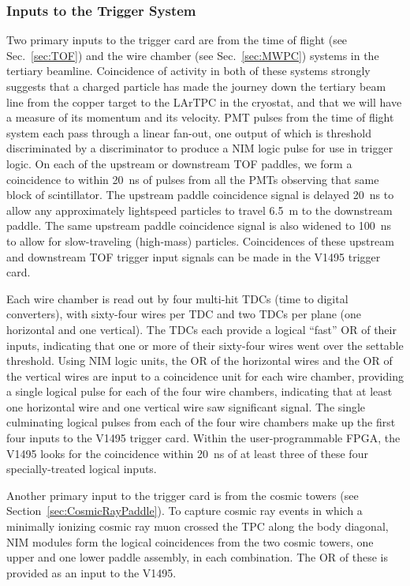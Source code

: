 \subsubsection{Inputs to the Trigger System}

Two primary inputs to the trigger card are from the time of flight (see Sec.~\ref{sec:TOF}) and the wire chamber (see Sec.~\ref{sec:MWPC}) systems in the tertiary beamline.  Coincidence of activity in both of these systems strongly suggests that a charged particle has made the journey down the tertiary beam line from the copper target to the LArTPC in the cryostat, and that we will have a measure of its momentum and its velocity. PMT pulses from the time of flight system each pass through a 
linear fan-out, one output of which is threshold discriminated by a
discriminator to produce a NIM logic pulse for use in trigger logic.  On each of the upstream or downstream TOF paddles, we form a coincidence to within 20~ns of pulses from all the PMTs observing that same block of scintillator.  The upstream paddle coincidence signal is delayed 20~ns to allow any approximately lightspeed particles to travel 6.5~m to the downstream paddle.  The same upstream paddle coincidence signal is also widened to 100~ns to allow for slow-traveling (high-mass) particles.  Coincidences of these upstream and downstream TOF trigger input signals can be made in the V1495 trigger card.

Each wire chamber is read out by four multi-hit TDCs (time to digital converters), with sixty-four wires per TDC and two TDCs per plane (one horizontal and one vertical).  The TDCs each provide a logical ``fast'' OR of their inputs, indicating that one or more of their sixty-four wires went over the settable threshold.  Using NIM logic units, the OR of the horizontal wires and the OR of the vertical wires are input to a coincidence unit for each wire chamber, providing a single logical pulse for each of the four wire chambers, indicating that at least one horizontal wire and one vertical wire saw significant signal.  The single culminating logical pulses from each of the four wire chambers make up the first four inputs to the V1495 trigger card.  Within the user-programmable FPGA, the V1495 looks for the coincidence within 20~ns of at least three of these four specially-treated logical inputs.

Another primary input to the trigger card is from the cosmic towers (see Section~\ref{sec:CosmicRayPaddle}). To capture cosmic ray events in which a minimally ionizing cosmic ray muon crossed the TPC along the body diagonal, NIM modules form the logical coincidences from the two cosmic towers, one upper and one lower paddle assembly, in each combination.  The OR of these is provided as an input to the V1495. 

